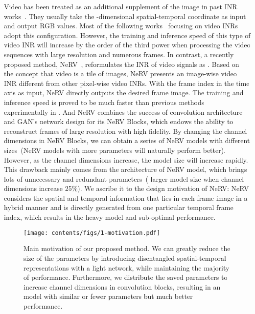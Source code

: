 \documentclass[runningheads]{llncs}
\begin{document}
Video has been treated as an additional supplement of the image in past INR works~\cite{sitzmann2020implicit,mehta2021modulated}. They usually take the -dimensional spatial-temporal coordinate  as input and output RGB values. Most of the following works~\cite{rho2022neural,zhang2021implicit} focusing on video INRs adopt this configuration. However, the training and inference speed of this type of video INR will increase by the order of the third power when processing the video sequences with large resolution and numerous frames. In contrast, a recently proposed method, NeRV~\cite{chen2021nerv}, reformulates the INR of video signals as . Based on the concept that video is a tile of images, NeRV presents an image-wise video INR different from other pixel-wise video INRs. With the frame index in the time axis as input, NeRV directly outputs the desired frame image. The training and inference speed is proved to be much faster than previous methods~\cite{sitzmann2020implicit,tancik2020fourier} experimentally in \cite{chen2021nerv}. And NeRV combines the success of convolution architecture and GAN's network design for its NeRV Blocks, which endows the ability to reconstruct frames of large resolution with high fidelity. By changing the channel dimensions in NeRV Blocks, we can obtain a series of NeRV models with different sizes~(NeRV models with more parameters will naturally perform better). However, as the channel dimensions increase, the model size will increase rapidly. This drawback mainly comes from the architecture of NeRV model, which brings lots of unnecessary and redundant parameters~( larger model size when channel dimensions increase 25\%). We ascribe it to the design motivation of NeRV: NeRV considers the spatial and temporal information that lies in each frame image in a hybrid manner and is directly generated from one particular temporal frame index, which results in the heavy model and sub-optimal performance.

\begin{figure}[t]
    \centering
    \texttt{[image: contents/figs/1-motivation.pdf]}
    \caption{Main motivation of our proposed method. We can greatly reduce the size of the parameters by introducing disentangled spatial-temporal representations with a light network, while maintaining the majority of performance. Furthermore, we distribute the saved parameters to increase channel dimensions in convolution blocks, resulting in an \netname model with similar or fewer parameters but much better performance.}
    \label{fig:motivation}
\end{figure}
\end{document}
